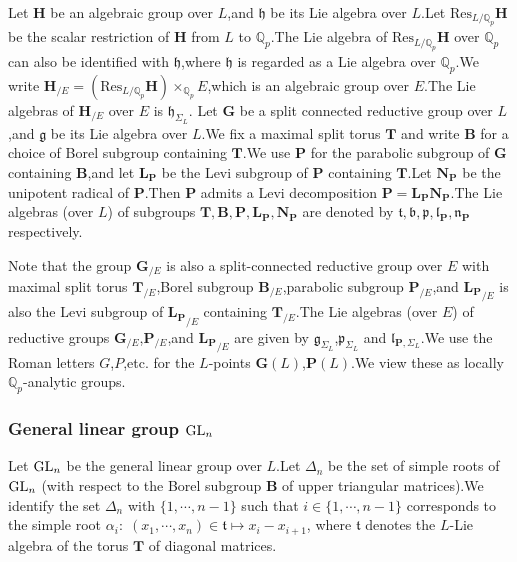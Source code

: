 \documentclass[SecEq,CM,GP]{degruyter-crelle} %
\theoremstyle{plain}
\newcommand{\GLN}{{\rm GL}}
\newcommand{\BQ}{{\mathbb{Q}}}
\newcommand{\bB}{{\mathbf{B}}}
\newcommand{\bG}{{\mathbf{G}}}
\newcommand{\bL}{{\mathbf{L}}}
\newcommand{\bN}{{\mathbf{N}}}
\newcommand{\bP}{{\mathbf{P}}}
\newcommand{\bT}{{\mathbf{T}}}
\newcommand{\fb}{{\mathfrak{b}}}
\newcommand{\fg}{{\mathfrak{g}}}
\newcommand{\fh}{{\mathfrak{h}}}
\newcommand{\fl}{{\mathfrak{l}}}
\newcommand{\fn}{{\mathfrak{n}}}
\newcommand{\fp}{{\mathfrak{p}}}
\newcommand{\ft}{{\mathfrak{t}}}
\begin{document}
Let $\mathbf{H}$ be an algebraic group over $L$,\;and $\fh$ be its Lie algebra over $L$.\;Let $\mathrm{Res}_{L/\BQ_p}\mathbf{H}$ be the scalar restriction of $\mathbf{H}$ from $L$ to $\BQ_p$.\;The Lie algebra of $\mathrm{Res}_{L/\BQ_p}\mathbf{H}$ over $\BQ_p$ can also be identified with $\fh$,\;where $\fh$ is regarded as a Lie algebra over $\BQ_p$.\;We write $\mathbf{H}_{/E}=(\mathrm{Res}_{L/\BQ_p}\mathbf{H})\times_{\BQ_p}E$,\;which is an algebraic group over $E$.\;The Lie algebras of $\mathbf{H}_{/E}$ over $E$ is $\fh_{\Sigma_L}$.\;
Let $\mathbf{G}$ be a split connected reductive group over $L$,\;and $\fg$ be its Lie algebra over $L$.\;We fix a maximal split torus $\bT$ and write $\bB$ for a choice of Borel subgroup containing $\bT$.\;We use $\bP$ for the parabolic subgroup of $\mathbf{G}$ containing $\bB$,\;and let $\bL_{\bP}$ be the Levi subgroup of $\bP$ containing $\bT$.\;Let $\bN_{\bP}$ be the unipotent radical of $\bP$.\;Then $\bP$ admits a Levi decomposition $\bP=\bL_{\bP}\bN_{\bP}$.\;The Lie algebras (over $L$) of subgroups $\bT,\bB,\bP,\bL_{\bP},\bN_{\bP}$  are denoted by $\ft,\fb,\fp,\fl_{\bP},\fn_{\bP}$ respectively.\;

Note that the group $\mathbf{G}_{/E}$ is also a split-connected reductive group over $E$ with maximal split torus $\bT_{/E}$,\;Borel subgroup $\bB_{/E}$,\;parabolic subgroup $\bP_{/E}$,\;and ${\bL_\bP}_{/E}$ is also the Levi subgroup of ${\bL_\bP}_{/E}$ containing $\bT_{/E}$.\;The Lie algebras (over $E$) of reductive groups $\mathbf{G}_{/E}$,\;$\bP_{/E}$,\;and ${\bL_\bP}_{/E}$ are given by $\fg_{\Sigma_L}$,\;$\fp_{\Sigma_L}$ and $\fl_{\bP,\Sigma_L}$.\;We use the Roman letters $G$,\;$P$,\;etc. for the $L$-points $\bG(L)$,\;$\bP(L)$.\;We view these as locally $\BQ_p$-analytic groups.


\subsubsection*{General linear group \texorpdfstring{$\GLN_n$}{Lg}}
Let $\GLN_n$ be the general linear group over $L$.\;Let $\Delta_n$ be the set of simple roots of $\GLN_n$ (with respect to the Borel subgroup $\bB$ of upper triangular matrices).\;We identify the set $\Delta_n$ with $\{1,\cdots, n-1\}$ such that $i\in \{1,\cdots, n-1\}$ corresponds to the simple root $\alpha_i:\;(x_1,\cdots, x_n)\in \ft \mapsto x_i-x_{i+1}$, where $\ft$ denotes the $L$-Lie algebra of the torus $\bT$ of diagonal matrices.\;
\end{document}
